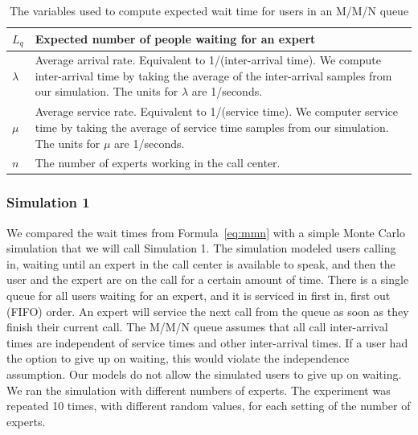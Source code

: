 \begin{table}
  \begin{tabular}{|l|p{5.8in}|}
    \hline
    $L_q$ & Expected number of people waiting for an expert\\
    \hline
    $\lambda$ & Average arrival rate. Equivalent to 1/(inter-arrival time).
                We compute inter-arrival time by taking the average of the
                inter-arrival samples from our simulation.
                The units for $\lambda$ are 1/seconds.\\
    \hline
    $\mu$ & Average service rate. Equivalent to 1/(service time).
            We computer service time by taking the average of service time
            samples from our simulation.
            The units for $\mu$ are 1/seconds.\\
    \hline
    $n$ & The number of experts working in the call center.\\
    \hline
  \end{tabular}
  \vspace{-0.1in}
  \caption{The variables used to compute expected wait time for users in an
    M/M/N queue}\label{tab:vars}
  \vspace{-0.1in}
\end{table}

\subsubsection{Simulation 1}

We compared the wait times from Formula~\ref{eq:mmn} with a simple Monte Carlo
simulation that we will call Simulation 1.
The simulation modeled users calling in, waiting until an expert in the
call center is available to speak, and then the user and the expert are on the
call for a certain amount of time.
There is a single queue for all users waiting for an expert, and it is serviced
in first in, first out (FIFO) order.
An expert will service the next call from the queue as soon as they finish their
current call.
The M/M/N queue assumes that all call inter-arrival times are independent of
service times and other inter-arrival times.
If a user had the option to give up on waiting, this would violate the
independence assumption.
Our models do not allow the simulated users to give up on waiting.
We ran the simulation with different numbers of experts.
The experiment was repeated 10 times, with different random values, for each
setting of the number of experts.

